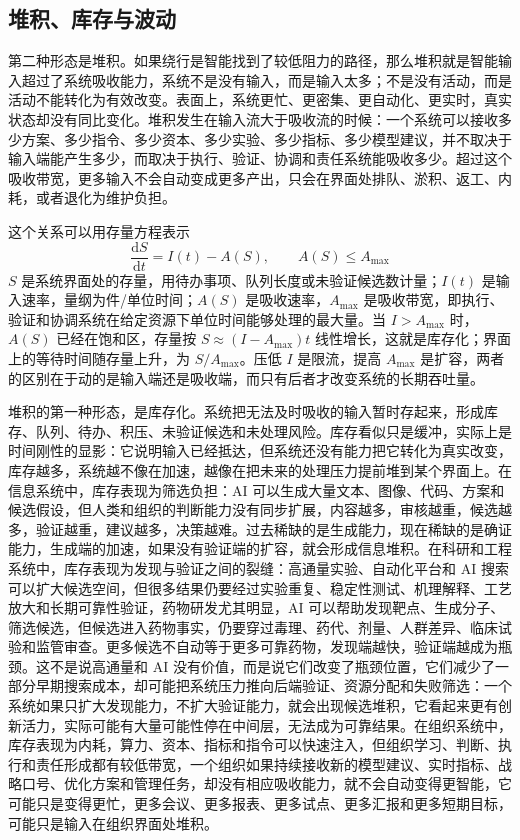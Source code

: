 \subsection{堆积、库存与波动}


第二种形态是堆积。如果绕行是智能找到了较低阻力的路径，那么堆积就是智能输入超过了系统吸收能力，系统不是没有输入，而是输入太多；不是没有活动，而是活动不能转化为有效改变。表面上，系统更忙、更密集、更自动化、更实时，真实状态却没有同比变化。堆积发生在输入流大于吸收流的时候：一个系统可以接收多少方案、多少指令、多少资本、多少实验、多少指标、多少模型建议，并不取决于输入端能产生多少，而取决于执行、验证、协调和责任系统能吸收多少。超过这个吸收带宽，更多输入不会自动变成更多产出，只会在界面处排队、淤积、返工、内耗，或者退化为维护负担。

这个关系可以用存量方程表示
\begin{equation}
\frac{\mathrm{d}S}{\mathrm{d}t}=I(t)-A(S),\qquad A(S)\le A_{\max}
\end{equation}
$S$ 是系统界面处的存量，用待办事项、队列长度或未验证候选数计量；$I(t)$ 是输入速率，量纲为件/单位时间；$A(S)$ 是吸收速率，$A_{\max}$ 是吸收带宽，即执行、验证和协调系统在给定资源下单位时间能够处理的最大量。当 $I>A_{\max}$ 时，$A(S)$ 已经在饱和区，存量按 $S\approx(I-A_{\max})t$ 线性增长，这就是库存化；界面上的等待时间随存量上升，为 $S/A_{\max}$。压低 $I$ 是限流，提高 $A_{\max}$ 是扩容，两者的区别在于动的是输入端还是吸收端，而只有后者才改变系统的长期吞吐量。

堆积的第一种形态，是库存化。系统把无法及时吸收的输入暂时存起来，形成库存、队列、待办、积压、未验证候选和未处理风险。库存看似只是缓冲，实际上是时间刚性的显影：它说明输入已经抵达，但系统还没有能力把它转化为真实改变，库存越多，系统越不像在加速，越像在把未来的处理压力提前堆到某个界面上。在信息系统中，库存表现为筛选负担：AI 可以生成大量文本、图像、代码、方案和候选假设，但人类和组织的判断能力没有同步扩展，内容越多，审核越重，候选越多，验证越重，建议越多，决策越难。过去稀缺的是生成能力，现在稀缺的是确证能力，生成端的加速，如果没有验证端的扩容，就会形成信息堆积。在科研和工程系统中，库存表现为发现与验证之间的裂缝：高通量实验、自动化平台和 AI 搜索可以扩大候选空间，但很多结果仍要经过实验重复、稳定性测试、机理解释、工艺放大和长期可靠性验证，药物研发尤其明显，AI 可以帮助发现靶点、生成分子、筛选候选，但候选进入药物事实，仍要穿过毒理、药代、剂量、人群差异、临床试验和监管审查。更多候选不自动等于更多可靠药物，发现端越快，验证端越成为瓶颈。这不是说高通量和 AI 没有价值，而是说它们改变了瓶颈位置，它们减少了一部分早期搜索成本，却可能把系统压力推向后端验证、资源分配和失败筛选：一个系统如果只扩大发现能力，不扩大验证能力，就会出现候选堆积，它看起来更有创新活力，实际可能有大量可能性停在中间层，无法成为可靠结果。在组织系统中，库存表现为内耗，算力、资本、指标和指令可以快速注入，但组织学习、判断、执行和责任形成都有较低带宽，一个组织如果持续接收新的模型建议、实时指标、战略口号、优化方案和管理任务，却没有相应吸收能力，就不会自动变得更智能，它可能只是变得更忙，更多会议、更多报表、更多试点、更多汇报和更多短期目标，可能只是输入在组织界面处堆积。

